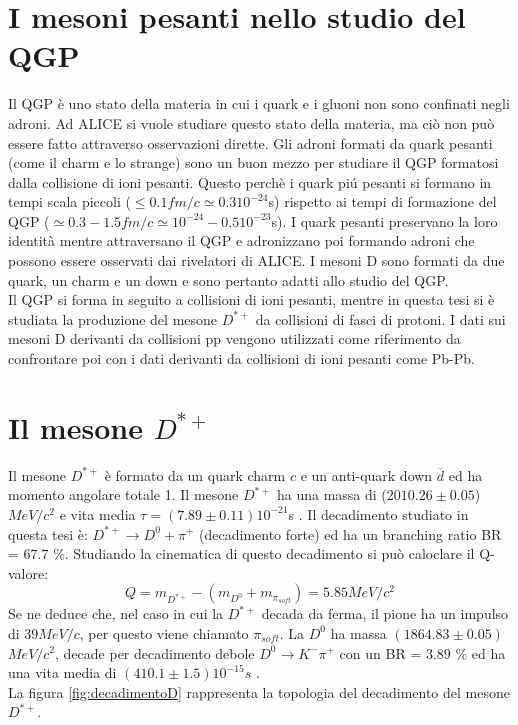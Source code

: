  
 
\section{I mesoni pesanti nello studio del QGP}
Il QGP è uno stato della materia in cui i quark e i gluoni non sono confinati negli adroni. Ad ALICE si vuole studiare questo stato della materia, ma ciò non può essere fatto attraverso osservazioni dirette. Gli adroni formati da quark pesanti (come il charm e lo strange) sono un buon mezzo per studiare il QGP formatosi dalla collisione di ioni pesanti. Questo perchè i quark piú pesanti si formano in tempi scala piccoli ($\leq 0.1 fm/c \simeq 0.3 10^{-24}$s) rispetto ai tempi di formazione del QGP ($\simeq 0.3 - 1.5 fm/c \simeq 10^{-24} - 0.5 10^{-23}$s). I quark pesanti preservano la loro identit\`a mentre attraversano il QGP e adronizzano poi formando adroni che possono essere osservati dai rivelatori di ALICE. I mesoni D sono formati da due quark, un charm e un down e sono pertanto adatti allo studio del QGP. 
\\Il QGP si forma in seguito a collisioni di ioni pesanti, mentre in questa tesi si \`e studiata la produzione del mesone $D^{*+}$ da collisioni di fasci di protoni. I dati sui mesoni D derivanti da collisioni pp vengono utilizzati come riferimento da confrontare poi con i dati derivanti da collisioni di ioni pesanti come Pb-Pb. 

\section{Il mesone $D^{*+}$} \label{mesoneD}
Il mesone $D^{*+}$ è formato da un quark charm $c$ e un anti-quark down $\overline{d}$ ed ha momento angolare totale 1. Il mesone $D^{*+}$ ha una massa di ($2010.26 \pm 0.05$) $MeV/c^2$ e vita media $ \tau = (7.89 \pm 0.11) {10^{-21}}$s \cite{PDG}. Il decadimento studiato in questa tesi \`e:  $D^{*+} \rightarrow D^0 + \pi^+ $ (decadimento forte) ed ha un branching ratio BR = $67.7$ $\%$. Studiando la cinematica di questo decadimento si pu\`o caloclare il Q-valore:
    \begin{equation}
        Q = m_{D^{*+}} - (m_{D^{0}} + m_{\pi_{soft}}) = 5.85 MeV/c^2
    \end{equation}
Se ne deduce che, nel caso in cui la $D^{*+}$ decada da ferma, il pione ha un impulso di $39 MeV/c$, per questo viene chiamato $\pi_{soft}$. %
La $D^0$ ha massa $ (1864.83 \pm 0.05) $ $MeV/c^2$, decade per decadimento debole $D^0 \rightarrow K^- \pi^+$ con un BR = $3.89$ $\%$ ed ha una vita media di $(410.1 \pm 1.5 ) 10^{-15} s $ \cite{PDG}.
\\La figura \ref{fig:decadimentoD} rappresenta la topologia del decadimento del mesone $D^{*+}$. 


